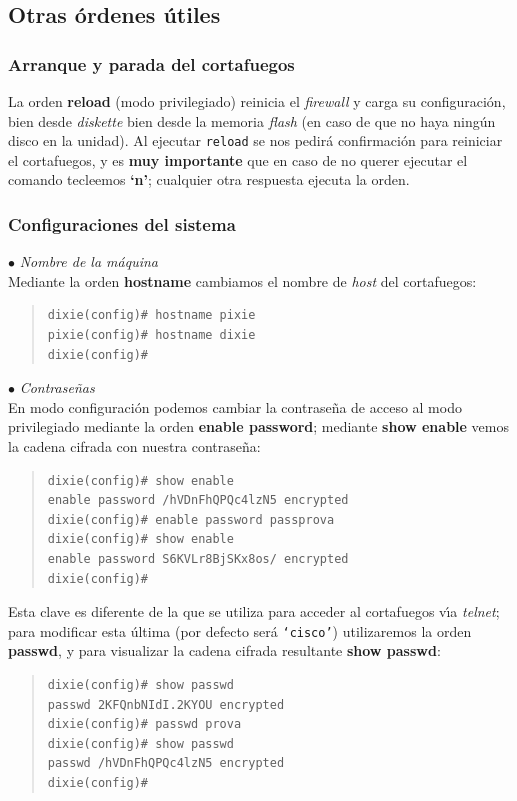 \subsection{Otras \'ordenes \'utiles}
\subsubsection{Arranque y parada del cortafuegos}
La orden {\bf reload} (modo privilegiado) reinicia el {\it firewall} y carga su configuraci\'on, bien desde {\it diskette} bien
desde la memoria {\it flash} (en caso de que no haya ning\'un disco en la unidad). Al ejecutar {\tt reload} se nos pedir\'a
confirmaci\'on para reiniciar el cortafuegos, y es {\bf muy importante} que en caso de no querer ejecutar el comando tecleemos {\bf 
`n'}; cualquier otra respuesta ejecuta la orden.
\subsubsection{Configuraciones del sistema}
\par{$\bullet$ {\it Nombre de la m\'aquina}}\\
Mediante la orden {\bf hostname} cambiamos el nombre de {\it host} del 
cortafuegos:
\begin{quote}
\begin{verbatim}
dixie(config)# hostname pixie
pixie(config)# hostname dixie
dixie(config)#
\end{verbatim}
\end{quote}
\par{$\bullet$ {\it Contrase\~nas}}\\
En modo configuraci\'on podemos cambiar la contrase\~na de acceso al modo privilegiado mediante la orden {\bf enable password};
mediante {\bf show enable} vemos la cadena cifrada con nuestra contrase\~na:
\begin{quote}
\begin{verbatim}
dixie(config)# show enable
enable password /hVDnFhQPQc4lzN5 encrypted
dixie(config)# enable password passprova
dixie(config)# show enable
enable password S6KVLr8BjSKx8os/ encrypted
dixie(config)#
\end{verbatim}
\end{quote}
Esta clave es diferente de la que se utiliza para acceder al cortafuegos v\'{\i}a {\it telnet}; para modificar esta \'ultima (por
defecto ser\'a {\tt `cisco'}) utilizaremos la orden {\bf passwd}, y para visualizar la cadena cifrada resultante {\bf show passwd}:
\begin{quote}
\begin{verbatim}
dixie(config)# show passwd
passwd 2KFQnbNIdI.2KYOU encrypted
dixie(config)# passwd prova
dixie(config)# show passwd
passwd /hVDnFhQPQc4lzN5 encrypted
dixie(config)#
\end{verbatim}
\end{quote}
